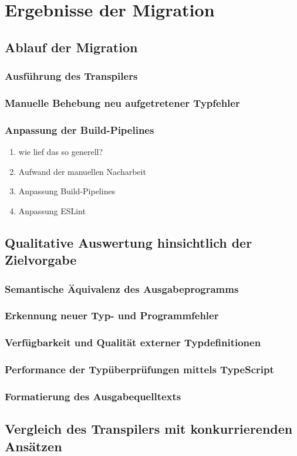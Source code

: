 \chapter{Ergebnisse der Migration}

\section{Ablauf der Migration}
  \subsection{Ausführung des Transpilers}
  \subsection{Manuelle Behebung neu aufgetretener Typfehler}
  \subsection{Anpassung der Build-Pipelines}

\begin{enumerate}
  \item wie lief das so generell?
  \item Aufwand der manuellen Nacharbeit
  \item Anpassung Build-Pipelines
  \item Anpassung ESLint
\end{enumerate}

\section{Qualitative Auswertung hinsichtlich der Zielvorgabe}

  \subsection{Semantische Äquivalenz des Ausgabeprogramms}

  \subsection{Erkennung neuer Typ- und Programmfehler}

  \subsection{Verfügbarkeit und Qualität externer Typdefinitionen}

  \subsection{Performance der Typüberprüfungen mittels TypeScript}

  \subsection{Formatierung des Ausgabequelltexts}

\section{Vergleich des Transpilers mit konkurrierenden Ansätzen}
